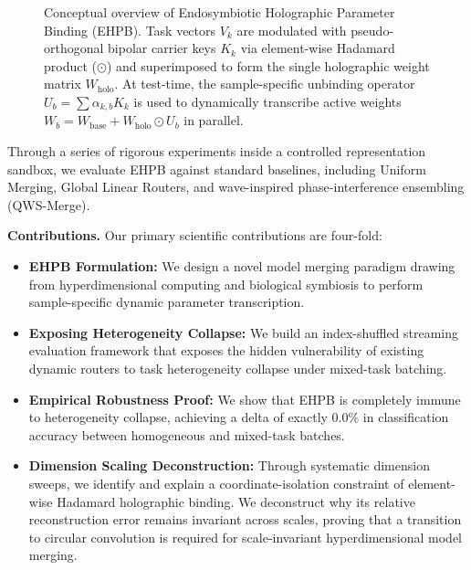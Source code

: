 \begin{figure}[t]
\caption{Conceptual overview of Endosymbiotic Holographic Parameter Binding (EHPB). Task vectors $V_k$ are modulated with pseudo-orthogonal bipolar carrier keys $K_k$ via element-wise Hadamard product ($\odot$) and superimposed to form the single holographic weight matrix $W_{\text{holo}}$. At test-time, the sample-specific unbinding operator $U_b = \sum \alpha_{k, b} K_k$ is used to dynamically transcribe active weights $W_b = W_{\text{base}} + W_{\text{holo}} \odot U_b$ in parallel.}
\label{fig:ehpb_concept}
\end{figure}

Through a series of rigorous experiments inside a controlled representation sandbox, we evaluate EHPB against standard baselines, including Uniform Merging, Global Linear Routers, and wave-inspired phase-interference ensembling (QWS-Merge).

\textbf{Contributions.} Our primary scientific contributions are four-fold:
\begin{itemize}
\item \textbf{EHPB Formulation:} We design a novel model merging paradigm drawing from hyperdimensional computing and biological symbiosis to perform sample-specific dynamic parameter transcription.
\item \textbf{Exposing Heterogeneity Collapse:} We build an index-shuffled streaming evaluation framework that exposes the hidden vulnerability of existing dynamic routers to task heterogeneity collapse under mixed-task batching.
\item \textbf{Empirical Robustness Proof:} We show that EHPB is completely immune to heterogeneity collapse, achieving a delta of exactly 0.0\% in classification accuracy between homogeneous and mixed-task batches.
\item \textbf{Dimension Scaling Deconstruction:} Through systematic dimension sweeps, we identify and explain a coordinate-isolation constraint of element-wise Hadamard holographic binding. We deconstruct why its relative reconstruction error remains invariant across scales, proving that a transition to circular convolution is required for scale-invariant hyperdimensional model merging.
\end{itemize}
